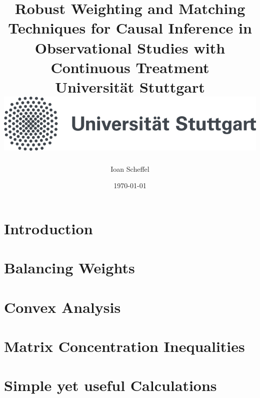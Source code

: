 \documentclass[12pt]{report}
\title{
  {
    Robust Weighting and Matching Techniques for Causal Inference in Observational Studies with Continuous Treatment
  }
  \\
  {\large Universität Stuttgart}
  \\
  {\includegraphics{unistuttgart_logo_deutsch.jpg}}
}
\author{Ioan Scheffel}
\date{\today}
\begin{document}
\maketitle

\tableofcontents 

\chapter{Introduction}


\chapter{Balancing Weights}


\chapter{Convex Analysis}


\chapter{Matrix Concentration Inequalities}


\chapter{Simple yet useful Calculations}




{}

\end{document}
